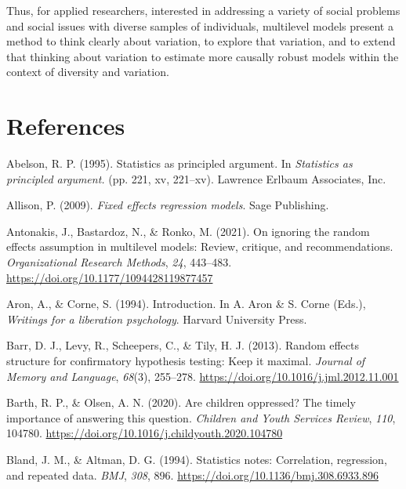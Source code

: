 \documentclass[
  letterpaper,
  DIV=11,
  numbers=noendperiod]{scrreprt}
\newlength{\cslhangindent}
\newenvironment{CSLReferences}[2] %
 {\begin{list}{}{%
  \setlength{\itemindent}{0pt}
  \setlength{\leftmargin}{0pt}
  \setlength{\parsep}{0pt}
  \ifodd #1
   \setlength{\leftmargin}{\cslhangindent}
   \setlength{\itemindent}{-1\cslhangindent}
  \fi
  \setlength{\itemsep}{#2\baselineskip}}}
 {\end{list}}
\begin{document}
Thus, for applied researchers, interested in addressing a variety of
social problems and social issues with diverse samples of individuals,
multilevel models present a method to think clearly about variation, to
explore that variation, and to extend that thinking about variation to
estimate more causally robust models within the context of diversity and
variation.


\chapter*{References}\label{references}


\label{refs}
\begin{CSLReferences}{1}{0}
Abelson, R. P. (1995). Statistics as principled argument. In
\emph{Statistics as principled argument.} (pp. 221, xv, 221--xv).
Lawrence Erlbaum Associates, Inc.

Allison, P. (2009). \emph{Fixed effects regression models}. Sage
Publishing.

Antonakis, J., Bastardoz, N., \& Ronko, M. (2021). On ignoring the
random effects assumption in multilevel models: Review, critique, and
recommendations. \emph{Organizational Research Methods}, \emph{24},
443--483. \url{https://doi.org/10.1177/1094428119877457}

Aron, A., \& Corne, S. (1994). Introduction. In A. Aron \& S. Corne
(Eds.), \emph{Writings for a liberation psychology}. Harvard University
Press.

Barr, D. J., Levy, R., Scheepers, C., \& Tily, H. J. (2013). Random
effects structure for confirmatory hypothesis testing: Keep it maximal.
\emph{Journal of Memory and Language}, \emph{68}(3), 255--278.
\url{https://doi.org/10.1016/j.jml.2012.11.001}

Barth, R. P., \& Olsen, A. N. (2020). Are children oppressed? The timely
importance of answering this question. \emph{Children and Youth Services
Review}, \emph{110}, 104780.
\url{https://doi.org/10.1016/j.childyouth.2020.104780}

Bland, J. M., \& Altman, D. G. (1994). Statistics notes: Correlation,
regression, and repeated data. \emph{BMJ}, \emph{308}, 896.
\url{https://doi.org/10.1136/bmj.308.6933.896}


\end{CSLReferences}
\end{document}
